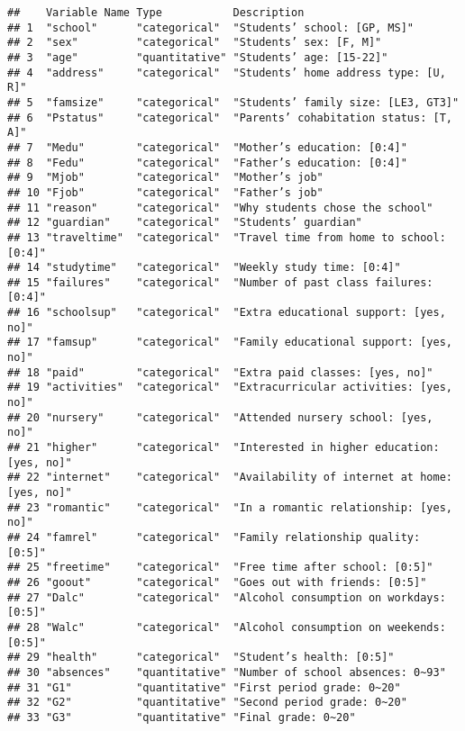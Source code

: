 \documentclass[
]{article}
\begin{document}
\begin{verbatim}
##    Variable Name Type           Description                                  
## 1  "school"      "categorical"  "Students’ school: [GP, MS]"                 
## 2  "sex"         "categorical"  "Students’ sex: [F, M]"                      
## 3  "age"         "quantitative" "Students’ age: [15-22]"                     
## 4  "address"     "categorical"  "Students’ home address type: [U, R]"        
## 5  "famsize"     "categorical"  "Students’ family size: [LE3, GT3]"          
## 6  "Pstatus"     "categorical"  "Parents’ cohabitation status: [T, A]"       
## 7  "Medu"        "categorical"  "Mother’s education: [0:4]"                  
## 8  "Fedu"        "categorical"  "Father’s education: [0:4]"                  
## 9  "Mjob"        "categorical"  "Mother’s job"                               
## 10 "Fjob"        "categorical"  "Father’s job"                               
## 11 "reason"      "categorical"  "Why students chose the school"              
## 12 "guardian"    "categorical"  "Students’ guardian"                         
## 13 "traveltime"  "categorical"  "Travel time from home to school: [0:4]"     
## 14 "studytime"   "categorical"  "Weekly study time: [0:4]"                   
## 15 "failures"    "categorical"  "Number of past class failures: [0:4]"       
## 16 "schoolsup"   "categorical"  "Extra educational support: [yes, no]"       
## 17 "famsup"      "categorical"  "Family educational support: [yes, no]"      
## 18 "paid"        "categorical"  "Extra paid classes: [yes, no]"              
## 19 "activities"  "categorical"  "Extracurricular activities: [yes, no]"      
## 20 "nursery"     "categorical"  "Attended nursery school: [yes, no]"         
## 21 "higher"      "categorical"  "Interested in higher education: [yes, no]"  
## 22 "internet"    "categorical"  "Availability of internet at home: [yes, no]"
## 23 "romantic"    "categorical"  "In a romantic relationship: [yes, no]"      
## 24 "famrel"      "categorical"  "Family relationship quality: [0:5]"         
## 25 "freetime"    "categorical"  "Free time after school: [0:5]"              
## 26 "goout"       "categorical"  "Goes out with friends: [0:5]"               
## 27 "Dalc"        "categorical"  "Alcohol consumption on workdays: [0:5]"     
## 28 "Walc"        "categorical"  "Alcohol consumption on weekends: [0:5]"     
## 29 "health"      "categorical"  "Student’s health: [0:5]"                    
## 30 "absences"    "quantitative" "Number of school absences: 0~93"            
## 31 "G1"          "quantitative" "First period grade: 0~20"                   
## 32 "G2"          "quantitative" "Second period grade: 0~20"                  
## 33 "G3"          "quantitative" "Final grade: 0~20"
\end{verbatim}
\end{document}
